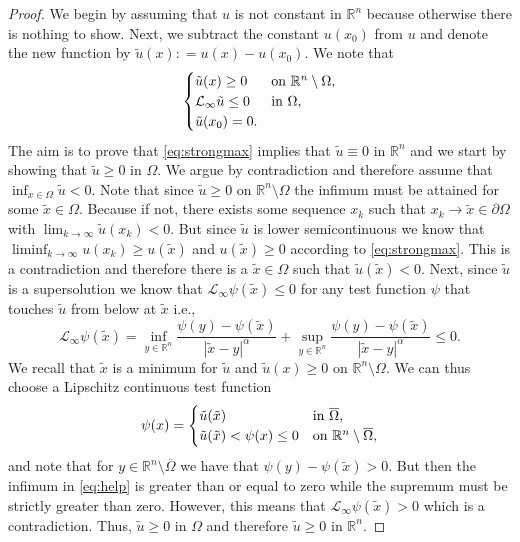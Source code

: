 \documentclass[11pt]{article}
\providecommand{\Linf}{\mathcal{L}_{\infty}}
\providecommand{\Rn}{\mathbb{R}^n}
\newcommand{\ol}{\overline}
\numberwithin{equation}{section}
\theoremstyle{definition}
\begin{document}
\begin{proof}
    We begin by assuming that $u$ is not constant in $\Rn$ because otherwise there is nothing to show. Next, we subtract the constant $u(x_0)$ from $u$ and denote the new function by $\tilde u(x): = u(x)-u(x_0)$. We note that
\begin{align} \label{eq:strongmax}
     \begin{cases}
                   \tilde u(x)\geq 0 & \textup{on} \ \Rn \setminus \Omega, \\
                    \Linf \tilde u \leq 0 & \textup{in} \ \Omega, \\
                    \tilde u(x_0) = 0.
     \end{cases}
\end{align}
The aim is to prove that \eqref{eq:strongmax} implies that $\tilde u \equiv 0$ in $\Rn$ and we start by showing that $\tilde u\geq 0 $ in $\Omega$. We argue by contradiction and therefore assume that
$\inf_{x \in \Omega} \tilde u < 0$. Note that since $\tilde{u} \geq 0$ on $\Rn \setminus \Omega$ the infimum must be attained for some $\tilde x \in \Omega$. Because if not, there exists some sequence $x_k$ such that $x_k \to \tilde{x} \in \partial \Omega$ with $\lim_{k \to \infty} \tilde u(x_k) < 0$. But since $\tilde u$ is lower semicontinuous we know that $\liminf_{k \to \infty} u(x_k) \geq u(\tilde{x})$ and $u(\tilde{x}) \geq 0$ according to \eqref{eq:strongmax}. This is a contradiction and therefore there is a $\tilde{x} \in \Omega$ such that $\tilde{u}(\tilde{x})<0$. Next, since $\tilde u$ is a supersolution we know that $\Linf \psi(\tilde{x}) \leq 0$ for any test function $\psi$ that touches $\tilde u$ from below at $\tilde x$ i.e., 
\begin{equation}
\label{eq:help}
\Linf \psi(\tilde{x}) = \inf_{y \in \Rn} \frac{\psi(y)-\psi(\tilde{x})}{|\tilde{x}-y|^{\alpha}} + \sup_{y \in \Rn} \frac{\psi(y)-\psi(\tilde{x})}{|\tilde{x}-y|^{\alpha}}  \leq 0.
\end{equation}
We recall that $\tilde{x}$ is a minimum for $\tilde u$ and $\tilde{u}(x) \geq 0$ on $\Rn \setminus \Omega$. We can thus choose a Lipschitz continuous test function 
\begin{align*}
   \psi(x) =  \begin{cases}
                   \tilde u(\tilde{x})\ & \textup{in} \ \ol{\Omega}, \\
                    \tilde u(\tilde{x}) < \psi(x) \leq 0 & \textup{on} \ \Rn \setminus \ol{\Omega},
     \end{cases}
\end{align*}
and note that for $y \in \Rn  \setminus \ol{\Omega}$ we have that $\psi(y)-\psi(\tilde x)>0$. But then the infimum in \eqref{eq:help} is greater than or equal to zero while the supremum must be strictly greater than zero. However, this means that $\Linf \psi(\tilde{x}) >  0$ which is a contradiction. Thus, $\tilde u \geq 0$ in $\Omega$ and therefore $\tilde{u}\geq0$ in $\Rn$.


\end{proof}
\end{document}
